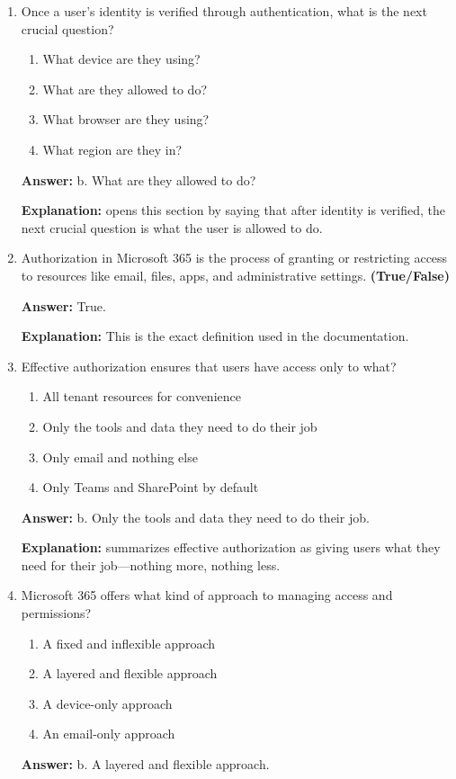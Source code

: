 \documentclass[10pt]{article}
\begin{document}
\begin{enumerate}[leftmargin=*]

\item Once a user’s identity is verified through authentication, what is the next crucial question?
\begin{enumerate}[label=\alph*., leftmargin=1.5em]
\item What device are they using?
\item What are they allowed to do?
\item What browser are they using?
\item What region are they in?
\end{enumerate}
\textbf{Answer:} b. What are they allowed to do?

\textbf{Explanation:} opens this section by saying that after identity is verified, the next crucial question is what the user is allowed to do.

\item Authorization in Microsoft 365 is the process of granting or restricting access to resources like email, files, apps, and administrative settings. \textbf{(True/False)}

\textbf{Answer:} True.

\textbf{Explanation:} This is the exact definition used in the documentation.

\item Effective authorization ensures that users have access only to what?
\begin{enumerate}[label=\alph*., leftmargin=1.5em]
\item All tenant resources for convenience
\item Only the tools and data they need to do their job
\item Only email and nothing else
\item Only Teams and SharePoint by default
\end{enumerate}
\textbf{Answer:} b. Only the tools and data they need to do their job.

\textbf{Explanation:} summarizes effective authorization as giving users what they need for their job—nothing more, nothing less.

\item Microsoft 365 offers what kind of approach to managing access and permissions?
\begin{enumerate}[label=\alph*., leftmargin=1.5em]
\item A fixed and inflexible approach
\item A layered and flexible approach
\item A device-only approach
\item An email-only approach
\end{enumerate}
\textbf{Answer:} b. A layered and flexible approach.


\end{enumerate}
\end{document}
